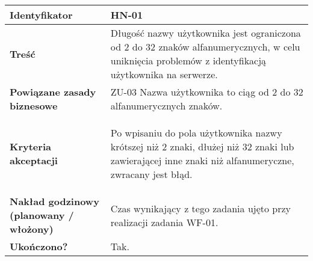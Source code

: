 \vspace{1em}

  \begin{tabular}{ | l | l | }
  	\hline
  		\textbf{Identyfikator} &
  		HN-01
  		\\

  	\hline
  		\textbf{Treść} & \parbox[t]{11.5cm}{\strut
  			Długość nazwy użytkownika jest ograniczona od 2 do 32 znaków alfanumerycznych, w celu uniknięcia problemów z identyfikacją użytkownika na serwerze.
  		\strut}\\

  	\hline
  		\parbox[t]{4cm}{\textbf{Powiązane zasady biznesowe}} & \parbox[t]{11.5cm}{\strut
  			ZU-03 Nazwa użytkownika to ciąg od 2 do 32 alfanumerycznych znaków.
  		\strut}\\

  	\hline
  		\parbox[t]{4cm}{\textbf{Kryteria akceptacji}} & \parbox[t]{11.5cm}{\strut
  			\begin{enumreq}
  				\item Po wpisaniu do pola użytkownika nazwy krótszej niż 2 znaki, dłużej niż 32 znaki lub zawierającej inne znaki niż alfanumeryczne, zwracany jest błąd.
  			\end{enumreq}
  			\strut}
  		\\

  	\hline
    \parbox[t]{4cm}{\textbf{Nakład godzinowy (planowany / włożony)}} & \parbox[t]{11.5cm}{\strut
      Czas wynikający z tego zadania ujęto przy realizacji zadania WF-01.
    \strut}\\
\hline

  \hline
    \parbox[t]{4cm}{\textbf{Ukończono?}} &
    \parbox[t]{11.5cm}{\strut
      Tak.
    \strut}\\

    \hline
  \end{tabular}

  \vspace{1em}

